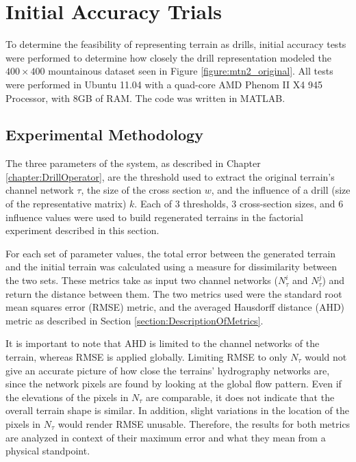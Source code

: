 \section{Initial Accuracy Trials}
\label{section:DrillAccuracyTests}

To determine the feasibility of representing terrain as drills, initial accuracy tests were performed to determine how closely the drill representation modeled the $400 \times 400$ mountainous dataset seen in Figure \ref{figure:mtn2_original}. All tests were performed in Ubuntu 11.04 with a quad-core AMD Phenom II X4 945 Processor, with 8GB of RAM. The code was written in MATLAB.

\subsection{Experimental Methodology}

The three parameters of the system, as described in Chapter \ref{chapter:DrillOperator}, are the threshold used to extract the original terrain's channel network $\tau$, the size of the cross section $w$, and the influence of a drill (size of the representative matrix) $k$. Each of 3 thresholds, 3 cross-section sizes, and 6 influence values were used to build regenerated terrains in the factorial experiment described in this section. 

For each set of parameter values, the total error between the generated terrain and the initial terrain was calculated using a measure for dissimilarity between the two sets.
These metrics take as input two channel networks
($N^{i}_{\tau}$ and $N^{j}_{\tau}$) and return the distance between
them.
 The two metrics used were the standard root mean squares error (RMSE) metric, and the averaged Hausdorff distance (AHD) metric as described in Section \ref{section:DescriptionOfMetrics}.

It is important to note that AHD is limited to the channel networks of the terrain, whereas RMSE is applied globally. Limiting RMSE to only $N_{\tau}$ would not give an accurate picture of how close the terrains' hydrography networks are, since the network pixels are found by looking at the global flow pattern. Even if the elevations of the pixels in $N_{\tau}$ are comparable, it does not indicate that the overall terrain shape is similar. In addition, slight variations in the location of the pixels in $N_{\tau}$ would render RMSE unusable. Therefore, the results for both metrics are analyzed in context of their maximum error and what they mean from a physical standpoint.

